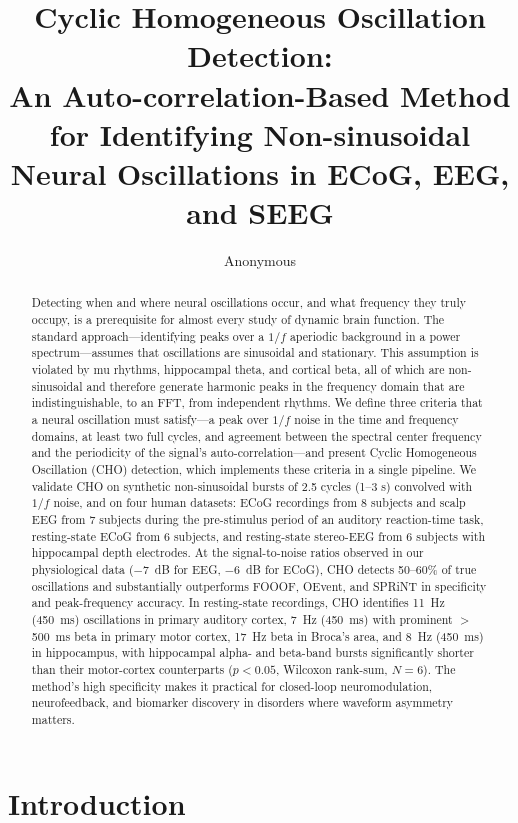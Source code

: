 \documentclass[11pt]{article}
\title{Cyclic Homogeneous Oscillation Detection:\\ An Auto-correlation-Based Method for Identifying Non-sinusoidal Neural Oscillations in ECoG, EEG, and SEEG}
\author{Anonymous}
\date{}
\begin{document}
\maketitle

\begin{abstract}
Detecting when and where neural oscillations occur, and what frequency they truly occupy, is a prerequisite for almost every study of dynamic brain function. The standard approach---identifying peaks over a $1/f$ aperiodic background in a power spectrum---assumes that oscillations are sinusoidal and stationary. This assumption is violated by mu rhythms, hippocampal theta, and cortical beta, all of which are non-sinusoidal and therefore generate harmonic peaks in the frequency domain that are indistinguishable, to an FFT, from independent rhythms. We define three criteria that a neural oscillation must satisfy---a peak over $1/f$ noise in the time and frequency domains, at least two full cycles, and agreement between the spectral center frequency and the periodicity of the signal's auto-correlation---and present Cyclic Homogeneous Oscillation (CHO) detection, which implements these criteria in a single pipeline. We validate CHO on synthetic non-sinusoidal bursts of 2.5 cycles (1--3 s) convolved with $1/f$ noise, and on four human datasets: ECoG recordings from 8 subjects and scalp EEG from 7 subjects during the pre-stimulus period of an auditory reaction-time task, resting-state ECoG from 6 subjects, and resting-state stereo-EEG from 6 subjects with hippocampal depth electrodes. At the signal-to-noise ratios observed in our physiological data ($-7$~dB for EEG, $-6$~dB for ECoG), CHO detects 50--60\% of true oscillations and substantially outperforms FOOOF, OEvent, and SPRiNT in specificity and peak-frequency accuracy. In resting-state recordings, CHO identifies 11~Hz (450~ms) oscillations in primary auditory cortex, 7~Hz (450~ms) with prominent $>$500~ms beta in primary motor cortex, 17~Hz beta in Broca's area, and 8~Hz (450~ms) in hippocampus, with hippocampal alpha- and beta-band bursts significantly shorter than their motor-cortex counterparts ($p < 0.05$, Wilcoxon rank-sum, $N=6$). The method's high specificity makes it practical for closed-loop neuromodulation, neurofeedback, and biomarker discovery in disorders where waveform asymmetry matters.
\end{abstract}

\section{Introduction}
\end{document}
